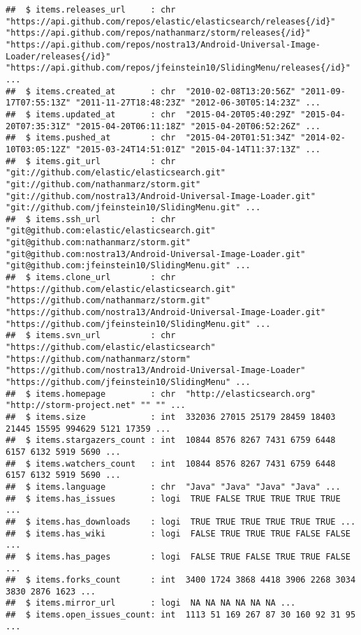 \documentclass{article}\usepackage[]{graphicx}\usepackage[]{color}
\makeatletter
\newenvironment{kframe}{%
 \def\at@end@of@kframe{}%
 \ifinner\ifhmode%
  \def\at@end@of@kframe{\end{minipage}}%
  \begin{minipage}{\columnwidth}%
 \fi\fi%
 \def\FrameCommand##1{\hskip\@totalleftmargin \hskip-\fboxsep
 \colorbox{shadecolor}{##1}\hskip-\fboxsep
     \hskip-\linewidth \hskip-\@totalleftmargin \hskip\columnwidth}%
 \MakeFramed {\advance\hsize-\width
   \@totalleftmargin\z@ \linewidth\hsize
   \@setminipage}}%
 {\par\unskip\endMakeFramed%
 \at@end@of@kframe}
\newenvironment{knitrout}{}{} %
\makeatother
\begin{document}
\begin{knitrout}
\begin{kframe}
\begin{verbatim}
##  $ items.releases_url     : chr  "https://api.github.com/repos/elastic/elasticsearch/releases{/id}" "https://api.github.com/repos/nathanmarz/storm/releases{/id}" "https://api.github.com/repos/nostra13/Android-Universal-Image-Loader/releases{/id}" "https://api.github.com/repos/jfeinstein10/SlidingMenu/releases{/id}" ...
##  $ items.created_at       : chr  "2010-02-08T13:20:56Z" "2011-09-17T07:55:13Z" "2011-11-27T18:48:23Z" "2012-06-30T05:14:23Z" ...
##  $ items.updated_at       : chr  "2015-04-20T05:40:29Z" "2015-04-20T07:35:31Z" "2015-04-20T06:11:18Z" "2015-04-20T06:52:26Z" ...
##  $ items.pushed_at        : chr  "2015-04-20T01:51:34Z" "2014-02-10T03:05:12Z" "2015-03-24T14:51:01Z" "2015-04-14T11:37:13Z" ...
##  $ items.git_url          : chr  "git://github.com/elastic/elasticsearch.git" "git://github.com/nathanmarz/storm.git" "git://github.com/nostra13/Android-Universal-Image-Loader.git" "git://github.com/jfeinstein10/SlidingMenu.git" ...
##  $ items.ssh_url          : chr  "git@github.com:elastic/elasticsearch.git" "git@github.com:nathanmarz/storm.git" "git@github.com:nostra13/Android-Universal-Image-Loader.git" "git@github.com:jfeinstein10/SlidingMenu.git" ...
##  $ items.clone_url        : chr  "https://github.com/elastic/elasticsearch.git" "https://github.com/nathanmarz/storm.git" "https://github.com/nostra13/Android-Universal-Image-Loader.git" "https://github.com/jfeinstein10/SlidingMenu.git" ...
##  $ items.svn_url          : chr  "https://github.com/elastic/elasticsearch" "https://github.com/nathanmarz/storm" "https://github.com/nostra13/Android-Universal-Image-Loader" "https://github.com/jfeinstein10/SlidingMenu" ...
##  $ items.homepage         : chr  "http://elasticsearch.org" "http://storm-project.net" "" "" ...
##  $ items.size             : int  332036 27015 25179 28459 18403 21445 15595 994629 5121 17359 ...
##  $ items.stargazers_count : int  10844 8576 8267 7431 6759 6448 6157 6132 5919 5690 ...
##  $ items.watchers_count   : int  10844 8576 8267 7431 6759 6448 6157 6132 5919 5690 ...
##  $ items.language         : chr  "Java" "Java" "Java" "Java" ...
##  $ items.has_issues       : logi  TRUE FALSE TRUE TRUE TRUE TRUE ...
##  $ items.has_downloads    : logi  TRUE TRUE TRUE TRUE TRUE TRUE ...
##  $ items.has_wiki         : logi  FALSE TRUE TRUE TRUE FALSE FALSE ...
##  $ items.has_pages        : logi  FALSE TRUE FALSE TRUE TRUE FALSE ...
##  $ items.forks_count      : int  3400 1724 3868 4418 3906 2268 3034 3830 2876 1623 ...
##  $ items.mirror_url       : logi  NA NA NA NA NA NA ...
##  $ items.open_issues_count: int  1113 51 169 267 87 30 160 92 31 95 ...

\end{verbatim}
\end{kframe}
\end{knitrout}
\end{document}
